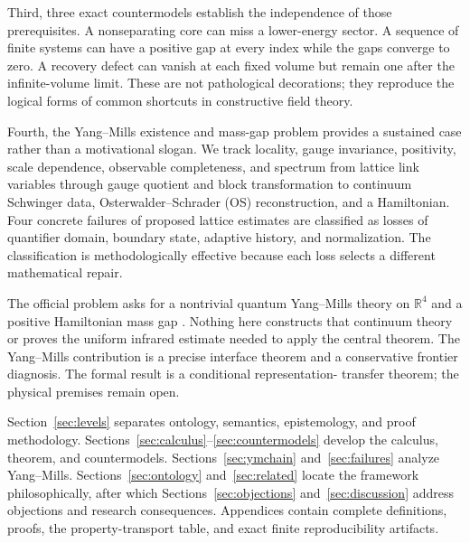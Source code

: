 Third, three exact countermodels establish the independence of those
prerequisites.  A nonseparating core can miss a lower-energy sector.  A
sequence of finite systems can have a positive gap at every index while the
gaps converge to zero.  A recovery defect can vanish at each fixed volume but
remain one after the infinite-volume limit.  These are not pathological
decorations; they reproduce the logical forms of common shortcuts in
constructive field theory.

Fourth, the Yang--Mills existence and mass-gap problem provides a sustained
case rather than a motivational slogan.  We track locality, gauge invariance,
positivity, scale dependence, observable completeness, and spectrum from
lattice link variables through gauge quotient and block transformation to
continuum Schwinger data, Osterwalder--Schrader (OS) reconstruction, and a
Hamiltonian.  Four concrete failures of proposed lattice estimates are
classified as losses of quantifier domain, boundary state, adaptive history,
and normalization.  The classification is methodologically effective because
each loss selects a different mathematical repair.

The official problem asks for a nontrivial quantum Yang--Mills theory on
$\mathbb R^4$ and a positive Hamiltonian mass gap
\cite{JaffeWitten2000}.  Nothing here constructs that continuum theory or
proves the uniform infrared estimate needed to apply the central theorem.
The Yang--Mills contribution is a precise interface theorem and a conservative
frontier diagnosis.  The formal result is a conditional representation-
transfer theorem; the physical premises remain open.

Section~\ref{sec:levels} separates ontology, semantics, epistemology, and
proof methodology.  Sections~\ref{sec:calculus}--\ref{sec:countermodels}
develop the calculus, theorem, and countermodels.  Sections~\ref{sec:ymchain}
and~\ref{sec:failures} analyze Yang--Mills.  Sections~\ref{sec:ontology}
and~\ref{sec:related} locate the framework philosophically, after which
Sections~\ref{sec:objections} and~\ref{sec:discussion} address objections and
research consequences.  Appendices contain complete definitions, proofs,
the property-transport table, and exact finite reproducibility artifacts.

